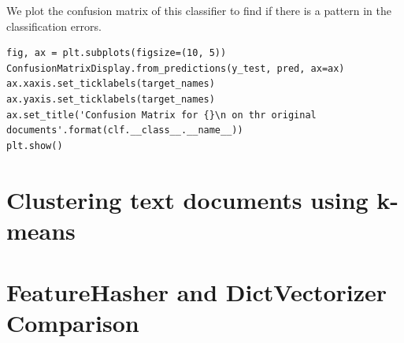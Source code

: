 We plot the confusion matrix of this classifier to find if there is a pattern in the classification errors.
\begin{verbatim}
fig, ax = plt.subplots(figsize=(10, 5))
ConfusionMatrixDisplay.from_predictions(y_test, pred, ax=ax)
ax.xaxis.set_ticklabels(target_names)
ax.yaxis.set_ticklabels(target_names)
ax.set_title('Confusion Matrix for {}\n on thr original documents'.format(clf.__class__.__name__))
plt.show()
\end{verbatim}
\section{Clustering text documents using k-means\label{Clustering text documents using k-means}}

\section{FeatureHasher and DictVectorizer Comparison\label{FeatureHasher and DictVectorizer Comparison}}

